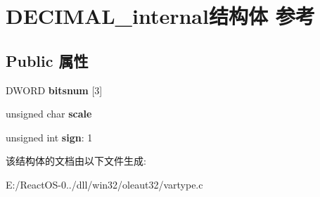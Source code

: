 \hypertarget{struct_d_e_c_i_m_a_l__internal}{}\section{D\+E\+C\+I\+M\+A\+L\+\_\+internal结构体 参考}
\label{struct_d_e_c_i_m_a_l__internal}
\subsection*{Public 属性}
\begin{DoxyCompactItemize}
\item 
\mbox{\label{struct_d_e_c_i_m_a_l__internal_a92f20183970916d544cd647afeb14eb2}} 
D\+W\+O\+RD {\bfseries bitsnum} \mbox{[}3\mbox{]}
\item 
\mbox{\label{struct_d_e_c_i_m_a_l__internal_ad3c600ff2a837dcfe3bb1e01d6824279}} 
unsigned char {\bfseries scale}
\item 
\mbox{\label{struct_d_e_c_i_m_a_l__internal_a011e22443c6075a569b16fd838959a0e}} 
unsigned int {\bfseries sign}\+: 1
\end{DoxyCompactItemize}


该结构体的文档由以下文件生成\+:\begin{DoxyCompactItemize}
\item 
E\+:/\+React\+O\+S-\/0../dll/win32/oleaut32/vartype.\+c\end{DoxyCompactItemize}
